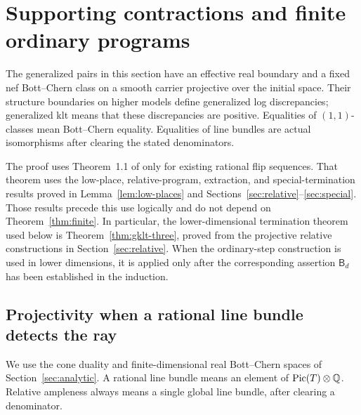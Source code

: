 \section{Supporting contractions and finite ordinary programs}
\label{sec:perturbation}\label{sec:contractions}

The generalized pairs in this section have an effective real boundary and
a fixed nef Bott--Chern class on a smooth carrier projective over the
initial space. Their structure boundaries on higher models define
generalized log discrepancies; generalized klt means that these
discrepancies are positive. Equalities of $(1,1)$-classes mean
Bott--Chern equality. Equalities of line bundles are actual isomorphisms
after clearing the stated denominators.

The proof uses Theorem~1.1 of \cite{OAI:Termination-of-generalized-log-canonical-flips-on-compact-Kahler-fourfolds-October-5-2026} only for existing
rational flip sequences. That theorem uses the low-place, relative-program,
extraction, and special-termination results proved in
Lemma~\ref{lem:low-places} and
Sections~\ref{sec:relative}--\ref{sec:special}. Those results precede
this use logically and do not depend on Theorem~\ref{thm:finite}.
In particular, the lower-dimensional
termination theorem used below is Theorem~\ref{thm:gklt-three}, proved
from the projective relative constructions in Section~\ref{sec:relative}.
When the ordinary-step construction is used in lower dimensions, it is
applied only after the corresponding assertion $\mathsf B_d$ has been
established in the induction.

\subsection{Projectivity when a rational line bundle detects the ray}

We use the cone duality and finite-dimensional real Bott--Chern
spaces of Section~\ref{sec:analytic}. A rational line bundle means an
element of $\operatorname{Pic}(T)\otimes\mathbb Q$. Relative ampleness always means a
single global line bundle, after clearing a denominator.

